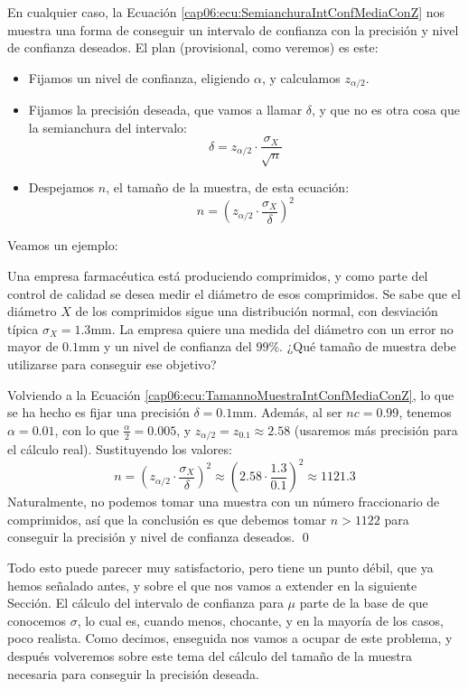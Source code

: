 En cualquier caso, la Ecuación \ref{cap06:ecu:SemianchuraIntConfMediaConZ} nos muestra una forma de conseguir un intervalo de confianza con la precisión y nivel de confianza deseados. El plan (provisional, como veremos) es este:
\begin{itemize}
  \item Fijamos un nivel de confianza, eligiendo $\alpha$, y calculamos $z_{\alpha/2}$.
  \item Fijamos la precisión deseada, que vamos a llamar $\delta$, y que no es otra cosa que la semianchura del intervalo:
      \begin{equation}\label{cap06:ecu:DeltaComoPrecisionIntConfMediaConZ}
        \delta=z_{\alpha/2}\cdot\dfrac{\sigma_X}{\sqrt{n}}
      \end{equation}
  \item Despejamos $n$, el tamaño de la muestra, de esta ecuación:
      \begin{equation}\label{cap06:ecu:TamannoMuestraIntConfMediaConZ}
        n=\left(z_{\alpha/2}\cdot\dfrac{\sigma_X}{\delta}\right)^2
      \end{equation}
\end{itemize}
Veamos un ejemplo:
\begin{ejemplo}
\label{cap06:ejem:DeterminacionTamannoMuestraIntConfConZ}
Una empresa farmacéutica está produciendo comprimidos, y como parte del control de calidad se desea medir el diámetro de esos comprimidos. Se sabe que el diámetro $X$ de los comprimidos sigue una distribución normal, con desviación típica $\sigma_X=1.3$mm. La empresa quiere una medida del diámetro con un error no mayor de $0.1$mm y un nivel de confianza del $99\%.$ ¿Qué tamaño de muestra debe utilizarse para conseguir ese objetivo?

Volviendo a la Ecuación \ref{cap06:ecu:TamannoMuestraIntConfMediaConZ}, lo que se ha hecho es fijar una precisión $\delta=0.1$mm. Además, al ser $nc=0.99$, tenemos $\alpha=0.01$, con lo que $\frac{\alpha}{2}=0.005$, y $z_{\alpha/2}=z_{0.1}\approx 2.58$ (usaremos más precisión para el cálculo real). Sustituyendo los valores:
\[
    n=\left(z_{\alpha/2}\cdot\dfrac{\sigma_X}{\delta}\right)^2
    \approx \left(2.58\cdot\dfrac{1.3}{0.1}\right)^2\approx 1121.3
\]
Naturalmente, no podemos tomar una muestra con un número fraccionario de comprimidos, así que la conclusión es que debemos tomar $n>1122$ para conseguir la precisión y nivel de confianza deseados.
\qed
\end{ejemplo}
Todo esto puede parecer muy satisfactorio, pero tiene un punto débil, que ya hemos señalado antes, y sobre el que nos vamos a extender en la siguiente Sección. El cálculo del intervalo de confianza para $\mu$ parte de la base de que conocemos $\sigma$, lo cual es, cuando menos, chocante, y en la mayoría de los casos, poco realista. Como decimos, enseguida nos vamos a ocupar de este problema, y después volveremos sobre este tema del cálculo del tamaño de la muestra necesaria para conseguir la precisión deseada.

